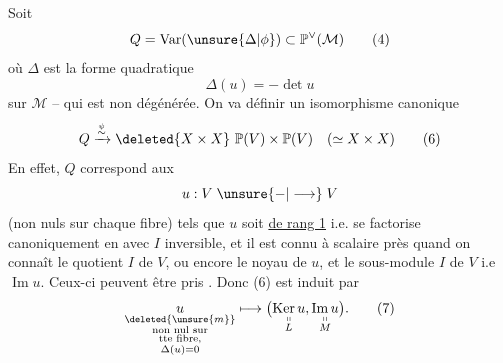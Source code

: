 Soit
\[
 Q=\operatorname{Var}(\unsure{\Delta|\phi})\subset\mathbb P^\vee(\mathcal M)\tag*{(4)}
\]
où $\Delta$ est la forme quadratique
\[
 \Delta(u)=-\det u\tag*{(5)}
\]
sur $\mathcal M$ -- qui est non dégénérée. On va définir un isomorphisme canonique
\[
 Q\xrightarrow{\overset{\psi}{\sim}}\deleted{X\times X}\ \mathbb P(V)\times\mathbb P(V)\quad(\simeq X\times X)\tag*{(6)}
\]
En effet, $Q$ correspond aux  
\[
 u:V\mathrel{\unsure{-|\longrightarrow}}V
\]
(non nuls sur chaque fibre) tels que $u$ soit \uline{ de rang 1} i.e. se factorise canoniquement en
avec $I$ inversible, et il est connu à  scalaire près quand on connaît le quotient $I$ de $V$,  ou encore le noyau de $u$, et  le sous-module $I$ de $V$ i.e $\operatorname{Im}u$. Ceux-ci peuvent être pris . Donc (6) est induit par
\[
 \underset{\substack{\deleted{\unsure{m}}\\\text{non nul sur}\\\text{tte fibre,}\\\Delta(u)=0}}{u}
 \longmapsto\bigl(\underset{\substack{\shortparallel\\L}}{\operatorname{Ker}u},
 \underset{\substack{\shortparallel\\M}}{\operatorname{Im}u}\bigr).\tag*{(7)}
\]
